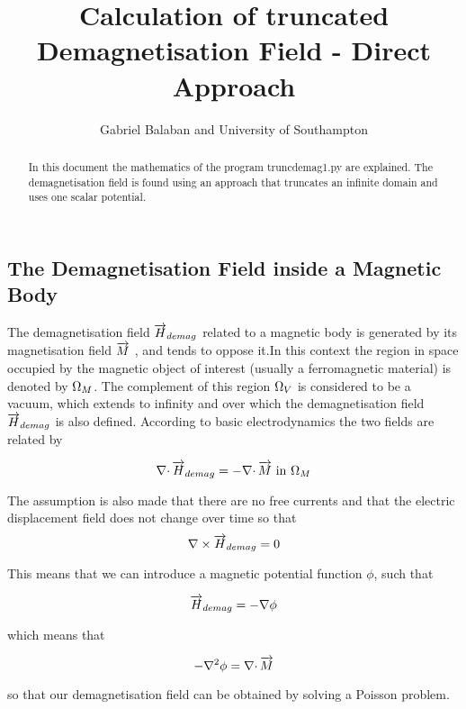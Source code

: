 \documentclass[12pt,a4paper,notitlepage]{article}
\title{Calculation of truncated Demagnetisation Field - Direct Approach}
\author{Gabriel Balaban and University of Southampton}
\begin{document}
\maketitle

\begin{abstract}
In this document the mathematics of the program truncdemag1.py are explained. The demagnetisation field is found
using an approach that truncates an infinite domain and uses one scalar potential.
\end{abstract}
\newpage
\subsection*{The Demagnetisation Field inside a Magnetic Body} 
The demagnetisation field $\overrightarrow{H}_{demag}$ related to a magnetic body is generated by its magnetisation field $\overrightarrow{M}$ ,
 and tends to oppose it.In this context the region in space occupied by the magnetic object of interest 
(usually a ferromagnetic material) is denoted by  $\Omega_M$.
The complement of this region $\Omega_V$ is considered to be a vacuum, which extends to infinity and over which
the demagnetisation field
$\overrightarrow{H}_{demag} $ is also defined.
According to basic electrodynamics the two fields are related by

\begin{equation}\label{dmagdef} \nabla \cdotp \overrightarrow{H}_{demag} = - \nabla \cdotp \overrightarrow{M} \  \mbox{in} \ \Omega_M \end{equation}

\noindent The assumption is also made that there are no free currents and that the electric displacement field does not change over time so that
\begin{equation}\label{nocurl} \nabla \times \overrightarrow{H}_{demag} = 0 \end{equation}

\noindent This means that we can introduce a magnetic potential function $\phi$, such that

\[ \overrightarrow{H}_{demag} = - \nabla \phi \]

\noindent which means that 

\[ - \nabla^2 \phi = \nabla \cdotp \overrightarrow{M} \]

\noindent so that our demagnetisation field can be obtained by solving a Poisson problem.
\end{document}
